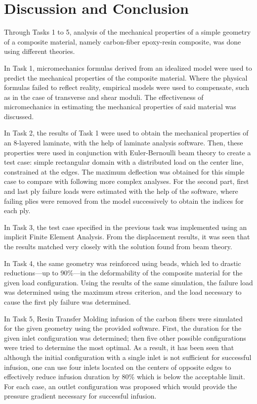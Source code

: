 \documentclass[a4paper,twosided,11pt,DIV14]{scrartcl}
\begin{document}
\section{Discussion and Conclusion}

Through Tasks 1 to 5, analysis of the mechanical properties of a simple geometry
of a composite material, namely carbon-fiber epoxy-resin composite, was
done using different theories.

In Task 1, micromechanics formulas derived from an idealized model were used to
predict the mechanical properties of the composite material. Where the physical
formulas failed to reflect reality, empirical models were used to compensate,
such as in the case of transverse and shear moduli. The effectiveness of
micromechanics in estimating the mechanical properties of said material was
discussed.

In Task 2, the results of Task 1 were used to obtain the mechanical
properties of an 8-layered laminate, with the help of laminate analysis
software. Then, these properties were used in conjunction with Euler-Bernoulli
beam theory to create a test case: simple rectangular domain with a distributed
load on the center line, constrained at the edges. The maximum deflection was
obtained for this simple case to compare with following more complex analyses.
For the second part, first and last ply failure loads were estimated with the
help of the software, where failing plies were removed from the model
successively to obtain the indices for each ply.

In Task 3, the test case specified in the previous task was implemented using an
implicit Finite Element Analysis. From the displacement results, it was seen
that the results matched very closely with the solution found from beam theory.

In Task 4, the same geometry was reinforced using beads, which led to drastic
reductions---up to 90\%---in the deformability of the composite material for the given
load configuration. Using the results of the same simulation, the failure load
was determined using the maximum stress criterion, and the load necessary to
cause the first ply failure was determined.

In Task 5, Resin Transfer Molding infusion of the carbon fibers were simulated
for the given geometry using the provided software. First, the duration for the
given inlet configuration was determined; then five other possible
configurations were tried to determine the most optimal. As a result, it has
been seen that although the initial configuration with a single inlet is not
sufficient for successful infusion, one can use four inlets located on the
centers of opposite edges to effectively reduce infusion duration by 80\% which
is below the acceptable limit. For each case, an outlet configuration was
proposed which would provide the pressure gradient necessary for successful
infusion.
\end{document}

